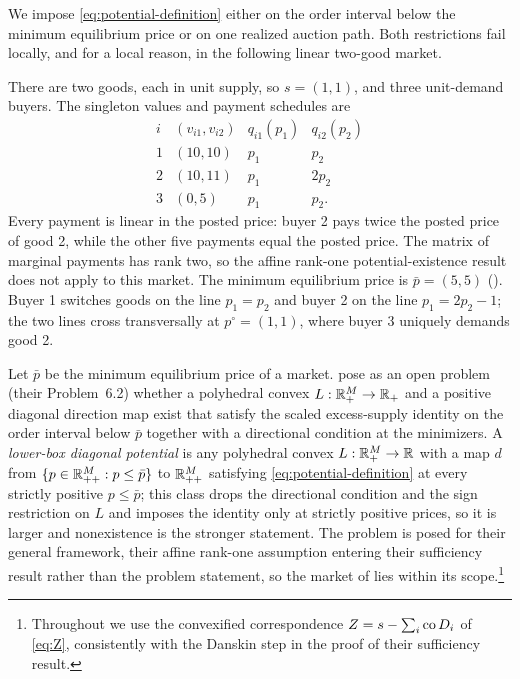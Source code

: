 We impose \eqref{eq:potential-definition} either on the order interval below the minimum equilibrium price or on one realized auction path. Both restrictions fail locally, and for a local reason, in the following linear two-good market.

\begin{example}\label{ex:two-good}
There are two goods, each in unit supply, so $s=(1,1)$, and three unit-demand buyers. The singleton values and payment schedules are
\begin{equation}\label{eq:path-market}
\begin{array}{c|c|cc}
 i &(v_{i1},v_{i2})&q_{i1}(p_1)&q_{i2}(p_2)\\ \hline
 1&(10,10)&p_1&p_2\\
 2&(10,11)&p_1&2p_2\\
 3&(0,5)&p_1&p_2.
\end{array}
\end{equation}
Every payment is linear in the posted price: buyer 2 pays twice the posted price of good 2, while the other five payments equal the posted price. The matrix of marginal payments has rank two, so the affine rank-one potential-existence result does not apply to this market. The minimum equilibrium price is $\bar p=(5,5)$ (). Buyer 1 switches goods on the line $p_1=p_2$ and buyer 2 on the line $p_1=2p_2-1$; the two lines cross transversally at $p^\circ=(1,1)$, where buyer 3 uniquely demands good 2.
\end{example}

Let $\bar p$ be the minimum equilibrium price of a market. \citet{okisato2026} pose as an open problem (their Problem~6.2) whether a polyhedral convex $L:\mathbb{R}_+^M\to\mathbb{R}_+$ and a positive diagonal direction map exist that satisfy the scaled excess-supply identity on the order interval below $\bar p$ together with a directional condition at the minimizers. A \emph{lower-box diagonal potential} is any polyhedral convex $L:\mathbb{R}_+^M\to\mathbb{R}$ with a map $d$ from $\{p\in\mathbb{R}_{++}^M:p\le\bar p\}$ to $\mathbb{R}_{++}^M$ satisfying \eqref{eq:potential-definition} at every strictly positive $p\le\bar p$; this class drops the directional condition and the sign restriction on $L$ and imposes the identity only at strictly positive prices, so it is larger and nonexistence is the stronger statement. The problem is posed for their general framework, their affine rank-one assumption entering their sufficiency result rather than the problem statement, so the market of  lies within its scope.\footnote{Throughout we use the convexified correspondence $Z=s-\sum_i\operatorname{co} D_i$ of \eqref{eq:Z}, consistently with the Danskin step in the proof of their sufficiency result.}

